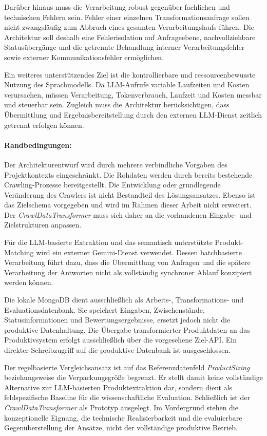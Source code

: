 Darüber hinaus muss die Verarbeitung robust gegenüber fachlichen und technischen Fehlern sein. Fehler einer einzelnen Transformationsanfrage sollen nicht zwangsläufig 
zum Abbruch eines gesamten Verarbeitungslaufs führen. Die Architektur soll deshalb eine Fehlerisolation auf Anfrageebene, nachvollziehbare Statusübergänge und die getrennte 
Behandlung interner Verarbeitungsfehler sowie externer Kommunikationsfehler ermöglichen.

Ein weiteres unterstützendes Ziel ist die kontrollierbare und ressourcenbewusste Nutzung des Sprachmodells. Da LLM-Aufrufe variable Laufzeiten und Kosten verursachen, 
müssen Verarbeitung, Tokenverbrauch, Laufzeit und Kosten messbar und steuerbar sein. Zugleich muss die Architektur berücksichtigen, dass Übermittlung und 
Ergebnisbereitstellung durch den externen LLM-Dienst zeitlich getrennt erfolgen können.

\paragraph{Randbedingungen:}

Der Architekturentwurf wird durch mehrere verbindliche Vorgaben des Projektkontexts eingeschränkt. Die Rohdaten werden durch bereits bestehende Crawling-Prozesse 
bereitgestellt. Die Entwicklung oder grundlegende Veränderung des Crawlers ist nicht Bestandteil des Lösungsansatzes. Ebenso ist das Zielschema vorgegeben und wird im 
Rahmen dieser Arbeit nicht erweitert. Der \textit{CrawlDataTransformer} muss sich daher an die vorhandenen Eingabe- und Zielstrukturen anpassen.

Für die LLM-basierte Extraktion und das semantisch unterstützte Produkt-Matching wird ein externer Gemini-Dienst verwendet. Dessen batchbasierte Verarbeitung führt dazu, 
dass die Übermittlung von Anfragen und die spätere Verarbeitung der Antworten nicht als vollständig synchroner Ablauf konzipiert werden können.

Die lokale MongoDB dient ausschließlich als Arbeits-, Transformations- und Evaluationsdatenbank. Sie speichert Eingaben, Zwischenstände, Statusinformationen und 
Bewertungsergebnisse, ersetzt jedoch nicht die produktive Datenhaltung. Die Übergabe transformierter Produktdaten an das Produktivsystem erfolgt ausschließlich über die 
vorgesehene Ziel-API. Ein direkter Schreibzugriff auf die produktive Datenbank ist ausgeschlossen.

Der regelbasierte Vergleichsansatz ist auf das Referenzdatenfeld \textit{ProductSizing} beziehungsweise die Verpackungsgröße begrenzt. Er stellt damit keine vollständige 
Alternative zur LLM-basierten Produktextraktion dar, sondern dient als feldspezifische Baseline für die wissenschaftliche Evaluation. Schließlich ist der 
\textit{CrawlDataTransformer} als Prototyp ausgelegt. Im Vordergrund stehen die konzeptionelle Eignung, die technische Realisierbarkeit und die evaluierbare Gegenüberstellung 
der Ansätze, nicht der vollständige produktive Betrieb.

